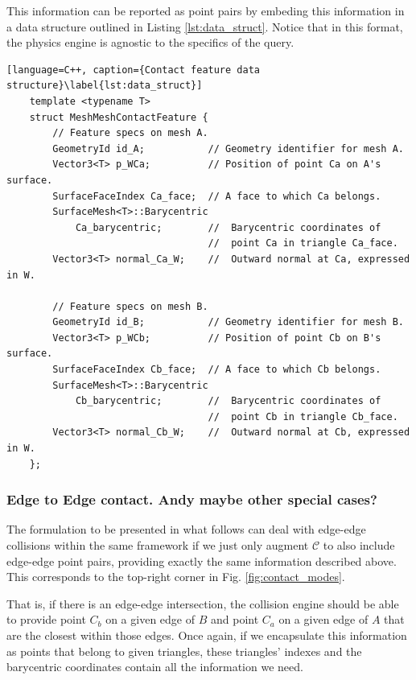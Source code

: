 \documentclass[a4paper]{article}
\begin{document}
This information can be reported as point pairs by embeding this information in
a data structure outlined in Listing \ref{lst:data_struct}. Notice that in this
format, the physics engine is agnostic to the specifics of the query.

\begin{lstlisting}[language=C++, caption={Contact feature data structure}\label{lst:data_struct}]
	template <typename T>
	struct MeshMeshContactFeature {
		// Feature specs on mesh A.
		GeometryId id_A;           // Geometry identifier for mesh A.     
		Vector3<T> p_WCa;          // Position of point Ca on A's surface.
		SurfaceFaceIndex Ca_face;  // A face to which Ca belongs.
		SurfaceMesh<T>::Barycentric
			Ca_barycentric;        //  Barycentric coordinates of
								   //  point Ca in triangle Ca_face.
		Vector3<T> normal_Ca_W;    //  Outward normal at Ca, expressed in W.						   
	
		// Feature specs on mesh B.
		GeometryId id_B;           // Geometry identifier for mesh B.
		Vector3<T> p_WCb;          // Position of point Cb on B's surface.
		SurfaceFaceIndex Cb_face;  // A face to which Cb belongs.
		SurfaceMesh<T>::Barycentric
			Cb_barycentric;        //  Barycentric coordinates of
								   //  point Cb in triangle Cb_face.
		Vector3<T> normal_Cb_W;    //  Outward normal at Cb, expressed in W.								   
	};		
\end{lstlisting}

\subsubsection{Edge to Edge contact. Andy maybe other special cases?}
The formulation to be presented in what follows can deal with edge-edge
collisions within the same framework if we just only augment
$\mathcal{C}$ to also include edge-edge point pairs, providing exactly
the same information described above. This corresponds to the top-right corner
in Fig. \ref{fig:contact_modes}.

That is, if there is an edge-edge intersection, the collision engine should be
able to provide point $C_b$ on a given edge of $B$ and point $C_a$ on a given
edge of $A$ that are the closest within those edges. Once again, if we
encapsulate this information as points that belong to given triangles, these
triangles' indexes and the barycentric coordinates contain all the information
we need.



 

\listoftodos
\end{document}
